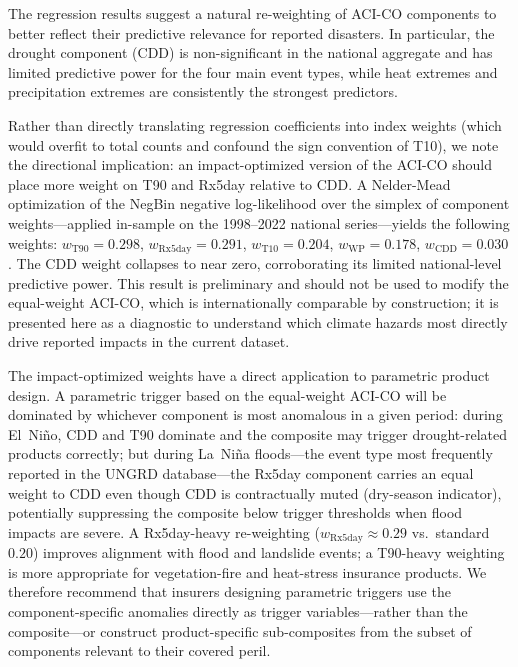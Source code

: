 \documentclass[12pt]{article}
\begin{document}
The regression results suggest a natural re-weighting of ACI-CO components to better reflect their predictive relevance for reported disasters. In particular, the drought component (CDD) is non-significant in the national aggregate and has limited predictive power for the four main event types, while heat extremes and precipitation extremes are consistently the strongest predictors.

Rather than directly translating regression coefficients into index weights (which would overfit to total counts and confound the sign convention of T10), we note the directional implication: an impact-optimized version of the ACI-CO should place more weight on T90 and Rx5day relative to CDD. A Nelder-Mead optimization of the NegBin negative log-likelihood over the simplex of component weights---applied in-sample on the 1998--2022 national series---yields the following weights: $w_{\mathrm{T90}}=0.298$, $w_{\mathrm{Rx5day}}=0.291$, $w_{\mathrm{T10}}=0.204$, $w_{\mathrm{WP}}=0.178$, $w_{\mathrm{CDD}}=0.030$. The CDD weight collapses to near zero, corroborating its limited national-level predictive power. This result is preliminary and should not be used to modify the equal-weight ACI-CO, which is internationally comparable by construction; it is presented here as a diagnostic to understand which climate hazards most directly drive reported impacts in the current dataset.

The impact-optimized weights have a direct application to parametric product design. A parametric trigger based on the equal-weight ACI-CO will be dominated by whichever component is most anomalous in a given period: during El~Ni\~no, CDD and T90 dominate and the composite may trigger drought-related products correctly; but during La~Ni\~na floods---the event type most frequently reported in the UNGRD database---the Rx5day component carries an equal weight to CDD even though CDD is contractually muted (dry-season indicator), potentially suppressing the composite below trigger thresholds when flood impacts are severe. A Rx5day-heavy re-weighting ($w_{\mathrm{Rx5day}} \approx 0.29$ vs.\ standard $0.20$) improves alignment with flood and landslide events; a T90-heavy weighting is more appropriate for vegetation-fire and heat-stress insurance products. We therefore recommend that insurers designing parametric triggers use the component-specific anomalies directly as trigger variables---rather than the composite---or construct product-specific sub-composites from the subset of components relevant to their covered peril.
 
\end{document}
